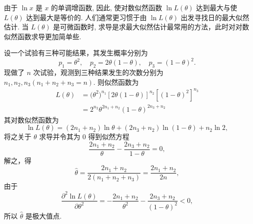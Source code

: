 由于 $\ln x$ 是 $x$ 的单调增函数, 因此, 使对数似然函数 $\ln L(\theta)$ 达到最大与使 $L(\theta)$ 达到最大是等价的. 人们通常更习惯于由 $\ln L(\theta)$ 出发寻找日的最大似然估计. 当 $L(\theta)$ 是可微函数时, 求导是求最大似然估计最常用的方法，此时对对数似然函数求导更加简单些.

\begin{example}
设一个试验有三种可能结果，其发生概率分别为
\begin{equation}\label{eq:6.1.8}
p_1=\theta^2,\quad p_2=2\theta(1-\theta),\quad p_3=(1-\theta)^2.
\end{equation}
现做了 $n$ 次试验，观测到三种结果发生的次数分别为 $n_1,n_2,n_3(n_1+n_2+n_3=n)$. 则似然函数为
\begin{align*}
L(\theta)
&=\big(\theta^{2}\big)^{n_1}[2 \theta(1-\theta)]^{n_{2}}\left[(1-\theta)^{2}\right]^{n_{3}} \\ &=2^{n_{2}} \theta^{2 n_{1}+n_{2}}(1-\theta)^{2 n_{3}+n_{2}}
\end{align*}
其对数似然函数为
\[\ln L(\theta)=\left(2 n_{1}+n_{2}\right)\ln\theta+\left(2 n_{3}+n_{2}\right)\ln (1-\theta)+n_{2}\ln 2,\]
将之关于 $\theta$ 求导并令其为 0 得到似然方程
\[\frac{2 n_{1}+n_{2}}{\theta}-\frac{2 n_{3}+n_{2}}{1-\theta}=0,\]
解之，得
\[\hat{\theta}=\frac{2 n_{1}+n_{2}}{2\left(n_{1}+n_{2}+n_{3}\right)}=\frac{2 n_{1}+n_{2}}{2 n},\]
由于
\[\frac{\partial^{2} \ln L(\theta)}{\partial \theta^{2}}=-\frac{2 n_{1}+n_{2}}{\theta^{2}}-\frac{2 n_{3}+n_{2}}{(1-\theta)^{2}}<0,\]
所以 $\hat{\theta}$ 是极大值点.
\end{example}

